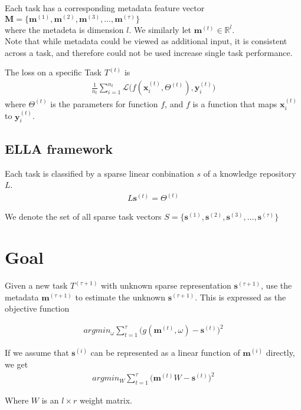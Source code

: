 \documentclass{article} %
\newcommand{\Tt}[1]{T^{(#1)}}
\newcommand{\Mt}[1]{\textbf{m}^{(#1)}}
\newcommand{\st}[1]{\textbf{s}^{(#1)}}
\newcommand{\Th}[1]{\Theta^{(#1)}}
\newcommand{\xit}[2]{\textbf{x}_{#1}^{(#2)}}
\newcommand{\yit}[2]{\textbf{y}_{#1}^{(#2)}}
\begin{document}
Each task has a corresponding metadata feature vector $\bm{M} =\{ \Mt{1} ,\Mt{2} ,\Mt{3}, \dots, \Mt{\tau}    \}$ \\
where the metadeta is dimension $l$. We similarly let $\Mt{t} \in \mathbb{R}^l$.\\
Note that while metadata could be viewed as additional input, it is consistent across a task, and therefore could not be used increase single task performance.

The loss on a specific Task $\Tt{t}$ is 
\begin{eqnarray}
	\frac{1}{n_t} \sum_{i=1}^{n_t} \mathcal{L}  \big(  f(\xit{i}{t}, \Th{t}) , \yit{i}{t} \big)
\end{eqnarray}
where $\Th{t}$ is the parameters for function $f$, and $f$ is a function that maps $\xit{i}{t}$ to $\yit{i}{t}$.


\subsection{ELLA framework}
Each task is classified by a sparse linear conbination $s$ of a knowledge repository $L$.
\begin{eqnarray}
	L\st{t} = \Th{t} 
\end{eqnarray}

We denote the set of all sparse task vectors  $S =\{ \st{1} ,\st{2} ,\st{3}, \dots, \st{\tau}    \}$ \\



\section{Goal}
Given a new task $\Tt{\tau+1}$ with unknown sparse representation $\st{\tau+1}$, use the metadata $\Mt{\tau+1}$ to estimate the unknown $\st{\tau+1}$. This is expressed as the objective function 

\begin{gather} 
	argmin_{\omega} \sum_{t=1}^{\tau} \big( g(\Mt{t}, \omega) - \st{t}  \big)^2 
\end{gather}

If we assume that $\st{i}$ can be represented as a linear function of $\Mt{i}$ directly, we get
\begin{gather} \label{eq:linear}
	argmin_{W} \sum_{t=1}^{\tau} \big( \Mt{t}W - \st{t}  \big)^2 
\end{gather}

Where $W$ is an $l \times r$ weight matrix.
\end{document}
